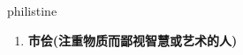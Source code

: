 
\begin{frame}
{\huge philistine}
\begin{center}
\begin{enumerate}\Large
  \item \textbf{市侩(注重物质而鄙视智慧或艺术的人)}
\end{enumerate}
\end{center}
\end{frame}
